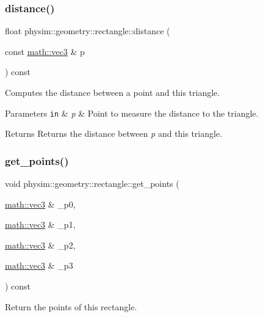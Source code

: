 \subsubsection{\texorpdfstring{distance()}{distance()}}
{\footnotesize\ttfamily float physim\+::geometry\+::rectangle\+::distance (\begin{DoxyParamCaption}\item[{const \hyperlink{structphysim_1_1math_1_1vec3}{math\+::vec3} \&}]{p }\end{DoxyParamCaption}) const}



Computes the distance between a point and this triangle. 


\begin{DoxyParams}[1]{Parameters}
\mbox{\tt in}  & {\em p} & Point to measure the distance to the triangle. \\
\hline
\end{DoxyParams}
\begin{DoxyReturn}{Returns}
Returns the distance between {\itshape p} and this triangle. 
\end{DoxyReturn}
\mbox{\label{classphysim_1_1geometry_1_1rectangle_a80175e242bff969131b81d671e339df9}} 
\subsubsection{\texorpdfstring{get\+\_\+points()}{get\_points()}}
{\footnotesize\ttfamily void physim\+::geometry\+::rectangle\+::get\+\_\+points (\begin{DoxyParamCaption}\item[{\hyperlink{structphysim_1_1math_1_1vec3}{math\+::vec3} \&}]{\+\_\+p0,  }\item[{\hyperlink{structphysim_1_1math_1_1vec3}{math\+::vec3} \&}]{\+\_\+p1,  }\item[{\hyperlink{structphysim_1_1math_1_1vec3}{math\+::vec3} \&}]{\+\_\+p2,  }\item[{\hyperlink{structphysim_1_1math_1_1vec3}{math\+::vec3} \&}]{\+\_\+p3 }\end{DoxyParamCaption}) const}



Return the points of this rectangle. 



